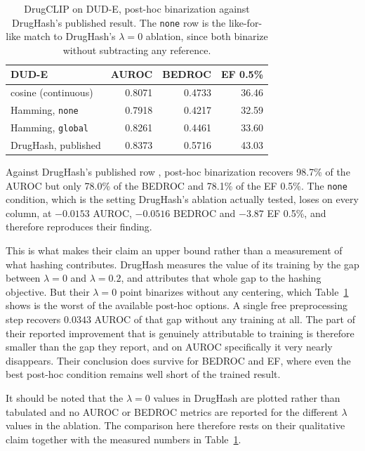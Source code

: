 \documentclass[10pt,a4paper]{article}
\begin{document}
\begin{table}[h]
\centering
\small
\caption{\label{tab:drughash}DrugCLIP on DUD-E, post-hoc binarization against DrugHash's published result. The
\texttt{none} row is the like-for-like match to DrugHash's $\lambda = 0$ ablation, since both
binarize without subtracting any reference.}
\begin{tabular}{lrrr}
\toprule
DUD-E & AUROC & BEDROC & EF 0.5\% \\
\midrule
cosine (continuous) & 0.8071 & 0.4733 & 36.46 \\
Hamming, \texttt{none} & 0.7918 & 0.4217 & 32.59 \\
Hamming, \texttt{global} & 0.8261 & 0.4461 & 33.60 \\
\midrule
DrugHash, published & 0.8373 & 0.5716 & 43.03 \\
\bottomrule
\end{tabular}
\end{table}

Against DrugHash's published row \citep{bib:drughash}, post-hoc binarization recovers 98.7\% of the AUROC but only
78.0\% of the BEDROC and 78.1\% of the EF 0.5\%. The \texttt{none} condition, which is the
setting DrugHash's ablation actually tested, loses on every column, at $-0.0153$ AUROC,
$-0.0516$ BEDROC and $-3.87$ EF 0.5\%, and therefore reproduces their finding.

This is what makes their claim an upper bound rather than a measurement of what hashing
contributes. DrugHash measures the value of its training by the gap between $\lambda = 0$ and
$\lambda = 0.2$, and attributes that whole gap to the hashing objective. But their
$\lambda = 0$ point binarizes without any centering, which Table~\ref{tab:drughash} shows is the worst of the
available post-hoc options. A single free preprocessing step recovers $0.0343$ AUROC of that
gap without any training at all. The part of their reported improvement that is genuinely
attributable to training is therefore smaller than the gap they report, and on AUROC
specifically it very nearly disappears. Their conclusion does survive for BEDROC and EF, where
even the best post-hoc condition remains well short of the trained result.

It should be noted that the $\lambda = 0$ values in DrugHash are plotted rather than tabulated
and no AUROC or BEDROC metrics are reported for the different $\lambda$ values in the
ablation. The comparison here therefore rests on their qualitative claim together with the
measured numbers in Table~\ref{tab:drughash}.
\end{document}
